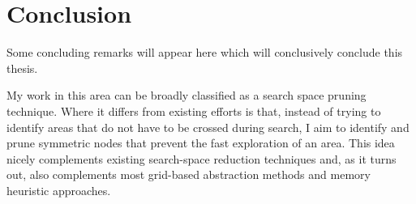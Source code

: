 \chapter{Conclusion}
\label{cha:conc}
Some concluding remarks will appear here which will conclusively conclude this thesis.

%


My work in this area can be broadly classified as a search space pruning
technique. Where it differs from existing efforts is that, instead of trying to
identify areas that do not have to be crossed during search, I aim to identify
and prune symmetric nodes that prevent the fast exploration of an area. This
idea nicely complements existing search-space reduction techniques and, as it
turns out, also complements most grid-based abstraction methods and memory
heuristic approaches.
